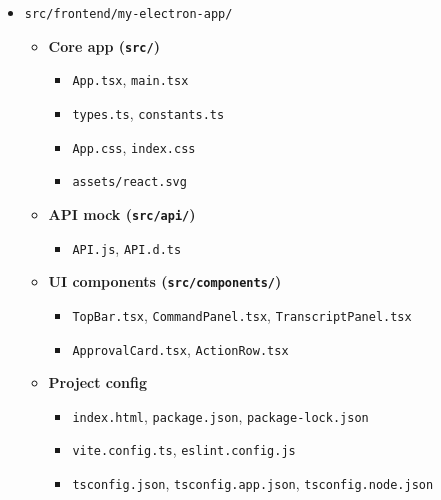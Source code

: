 \documentclass[12pt, titlepage]{article}
\begin{document}
\begin{enumerate}
        \begin{itemize}
          \item \texttt{src/frontend/my-electron-app/}
                \begin{itemize}
                  \item \textbf{Core app (\texttt{src/})}
                        \begin{itemize}
                          \item \texttt{App.tsx}, \texttt{main.tsx}
                          \item \texttt{types.ts}, \texttt{constants.ts}
                          \item \texttt{App.css}, \texttt{index.css}
                          \item \texttt{assets/react.svg}
                        \end{itemize}

                  \item \textbf{API mock (\texttt{src/api/})}
                        \begin{itemize}
                          \item \texttt{API.js}, \texttt{API.d.ts}
                        \end{itemize}

                  \item \textbf{UI components (\texttt{src/components/})}
                        \begin{itemize}
                          \item \texttt{TopBar.tsx}, \texttt{CommandPanel.tsx}, \texttt{TranscriptPanel.tsx}
                          \item \texttt{ApprovalCard.tsx}, \texttt{ActionRow.tsx}
                        \end{itemize}

                  \item \textbf{Project config}
                        \begin{itemize}
                          \item \texttt{index.html}, \texttt{package.json}, \texttt{package-lock.json}
                          \item \texttt{vite.config.ts}, \texttt{eslint.config.js}
                          \item \texttt{tsconfig.json}, \texttt{tsconfig.app.json}, \texttt{tsconfig.node.json}
                        \end{itemize}
                \end{itemize}
        \end{itemize}

\end{enumerate}
\end{document}
